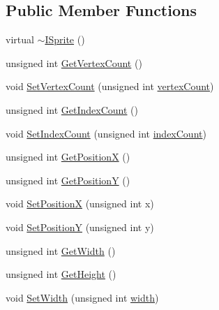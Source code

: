 \subsection*{Public Member Functions}
\begin{DoxyCompactItemize}
\item 
virtual \hyperlink{class_osiris_i_1_1_graphics_1_1_actors_1_1_i_sprite_af03704fccc3c30e6bdab25e42c9008e6}{$\sim$\-I\-Sprite} ()
\item 
unsigned int \hyperlink{class_osiris_i_1_1_graphics_1_1_actors_1_1_i_sprite_a7d0a4bd312b0214b5625c9a552c187c6}{Get\-Vertex\-Count} ()
\item 
void \hyperlink{class_osiris_i_1_1_graphics_1_1_actors_1_1_i_sprite_a8c915ad69a29a6f7f1dfe82a3674dc88}{Set\-Vertex\-Count} (unsigned int \hyperlink{class_osiris_i_1_1_graphics_1_1_actors_1_1_i_sprite_a438ae426c13697237a0284686d3a8481}{vertex\-Count})
\item 
unsigned int \hyperlink{class_osiris_i_1_1_graphics_1_1_actors_1_1_i_sprite_a78997b99443cd84e6244c9fc51d47d9b}{Get\-Index\-Count} ()
\item 
void \hyperlink{class_osiris_i_1_1_graphics_1_1_actors_1_1_i_sprite_aabc5b9c9468d79090073cb92d01615a3}{Set\-Index\-Count} (unsigned int \hyperlink{class_osiris_i_1_1_graphics_1_1_actors_1_1_i_sprite_acaca77ce9bc41f058aba104b26dce537}{index\-Count})
\item 
unsigned int \hyperlink{class_osiris_i_1_1_graphics_1_1_actors_1_1_i_sprite_a7fe3dc93a367d241a18efe2a3c593ffe}{Get\-Position\-X} ()
\item 
unsigned int \hyperlink{class_osiris_i_1_1_graphics_1_1_actors_1_1_i_sprite_a3dd7cbf7f30dd54577f8930bf43bf0a6}{Get\-Position\-Y} ()
\item 
void \hyperlink{class_osiris_i_1_1_graphics_1_1_actors_1_1_i_sprite_a517fc4591d9400577b3a15d3c6000dd9}{Set\-Position\-X} (unsigned int x)
\item 
void \hyperlink{class_osiris_i_1_1_graphics_1_1_actors_1_1_i_sprite_a6b6220ab8073e3953ca890e6c67b7b43}{Set\-Position\-Y} (unsigned int y)
\item 
unsigned int \hyperlink{class_osiris_i_1_1_graphics_1_1_actors_1_1_i_sprite_a78a90e68aabcb53d18fe48e226f0ff58}{Get\-Width} ()
\item 
unsigned int \hyperlink{class_osiris_i_1_1_graphics_1_1_actors_1_1_i_sprite_a6ac2aabcec4451748314e83470286e85}{Get\-Height} ()
\item 
void \hyperlink{class_osiris_i_1_1_graphics_1_1_actors_1_1_i_sprite_acb3a29e941aad63ea09a9a64fa95fb45}{Set\-Width} (unsigned int \hyperlink{class_osiris_i_1_1_graphics_1_1_actors_1_1_i_sprite_a4d463bbb08fdf10f2de2298467383faa}{width})

\end{DoxyCompactItemize}
